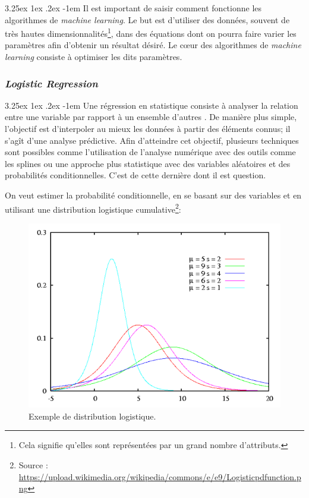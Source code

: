 \documentclass[a4paper, 11pt]{article}
\makeatletter
\renewcommand\paragraph{\@startsection{paragraph}{5}{\z@}%
  {3.25ex \@plus1ex \@minus.2ex}%
  {-1em}%
  {\normalfont\normalsize\bfseries}}
\makeatother
\begin{document}
\paragraph{}
Il est important de saisir comment fonctionne les algorithmes de \textit{machine learning}. 
Le but est d'utiliser des données, souvent de très hautes dimensionnalités\footnote{Cela signifie qu'elles 
sont représentées par un grand nombre d'attributs.}, dans des équations dont on pourra faire varier 
les paramètres afin d'obtenir un résultat désiré. Le cœur des algorithmes de \textit{machine learning} 
consiste à optimiser les dits paramètres.

\subsubsection{\textit{Logistic Regression}} \label{section régression logistique}
\paragraph{}
Une régression en statistique consiste à analyser la relation entre une variable par rapport à un ensemble d'autres 
\cite{wikipedia_regression}. De manière plus simple, l'objectif est d'interpoler au mieux les données à partir des éléments connus; il s'agît d'une analyse prédictive. Afin d'atteindre cet objectif, plusieurs techniques sont possibles comme l'utilisation de l'analyse numérique avec des outils comme les splines\cite{spline_schoenberg_isaac} ou une approche plus statistique avec des variables aléatoires et des probabilités conditionnelles. C'est de cette dernière dont il est question.

On veut estimer la probabilité conditionnelle, en se basant sur des variables et 
en utilisant une distribution logistique cumulative\footnote{Source : \url{https://upload.wikimedia.org/wikipedia/commons/e/e9/Logisticpdfunction.png}}:
\begin{figure}[h!]
	\centering
	\includegraphics[scale=0.75]{images/logistic_distribution}
	\caption{Exemple de distribution logistique.}
\end{figure}
\end{document}
